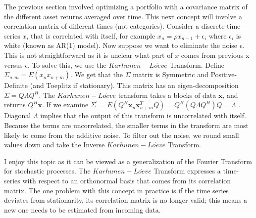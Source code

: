\documentclass[final]{siamart1116}
\begin{document}
The previous section involved optimizing a portfolio with a covariance matrix of the different asset returns averaged over time. This next concept will involve a correlation matrix of different times (not categories). Consider a discrete time-series $x$, that is correlated with itself, for example $x_{n} = \rho x_{n - 1} + \epsilon_i$ where $\epsilon_i$ is white (known as AR(1) model). Now suppose we want to eliminate the noise $\epsilon$. This is not straightforward as it is unclear what part of $x$ comes from previous x versus $\epsilon$. To solve this, we use the $Karhunen-Lo\grave{e}ve$ Transform. Define $\Sigma_{n,m} = E(x_{n}x_{n + m})$. We get that the $\Sigma$ matrix is Symmetric and Positive-Definite (and Toeplitz if stationary). This matrix has an eigen-decomposition $\Sigma = Q\Lambda Q^{H}$. The $Karhunen-Lo\grave{e}ve$ transform takes a blocks of data $\textbf{x}$, and returns $Q^{H}\textbf{x}$. If we examine $\Sigma^{'} = E(Q^{H}\textbf{x}_{n} \textbf{x}^{T}_{n + m}Q) = Q^{H}(Q \Lambda Q^{H})Q = \Lambda$ \cite{akansu}. Diagonal $\Lambda$ implies that the output of this transform is uncorrelated with itself. Because the terms are uncorrelated, the smaller terms in the transform are most likely to come from the additive noise. To filter out the noise, we round small values down and take the Inverse $Karhunen-Lo\grave{e}ve$ Transform.

I enjoy this topic as it can be viewed as a generalization of the Fourier Transform for stochastic processes. The $Karhunen-Lo\grave{e}ve$ Transform expresses a time-series with respect to an orthonormal basis that comes from its correlation matrix. The one problem with this concept in practice is if the time series deviates from stationarity, its correlation matrix is no longer valid; this means a new one needs to be estimated from incoming data.




\end{document}

